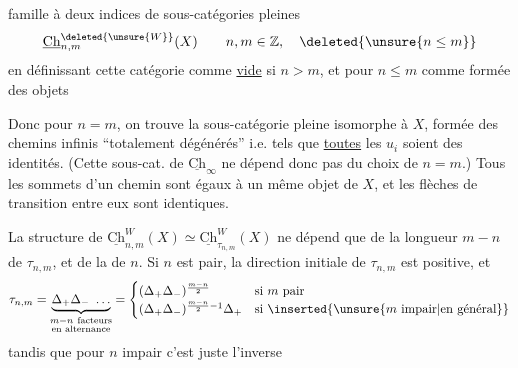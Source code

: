 famille à deux indices de sous-catégories
pleines
\[
\underline{\mathrm{Ch}}_{n,m}^{\deleted{\unsure{W}}}(X)\qquad n,m\in\mathbb Z,\quad\deleted{\unsure{n\leq m}}
\]
en définissant cette catégorie comme \uline{vide} si $n>m$,
et pour $n\leq m$ comme formée des objets

Donc pour $n=m$, on trouve la sous-catégorie pleine
isomorphe à $X$, formée des chemins infinis
``totalement dégénérés'' i.e. tels que \uline{toutes} les
$u_i$ soient des identités. (Cette sous-cat. de
$\underline{\mathrm{Ch}}_{\infty}$ ne dépend donc pas du choix de $n=m$.)
Tous les sommets d'un   chemin sont égaux
à un même objet  de $X$, et les flèches
de transition entre eux sont identiques.

La structure de $\underline{\mathrm{Ch}}^W_{n,m}(X)\simeq\underline{\mathrm{Ch}}^W_{\tau_{n,m}}(X)$
ne dépend que de la longueur $m-n$ de $\tau_{n,m}$,
et de la \uline{} de $n$. Si $n$ est pair,
la direction initiale de $\tau_{n,m}$ est positive,
et
\[
\tau_{n,m}=\underbrace{\Delta_+\Delta_-\ \ldots}_{\substack{m-n\ \text{facteurs}\\\text{en alternance}}}
=\begin{cases}
(\Delta_+\Delta_-)^{\frac{m-n}{2}}&\text{si }m\text{ pair}\\
(\Delta_+\Delta_-)^{\frac{m-n}{2}-1}\Delta_+&\text{si }\inserted{\unsure{m\text{ impair}|\text{en général}}}
\end{cases}
\]
tandis que pour $n$ impair c'est juste l'inverse
